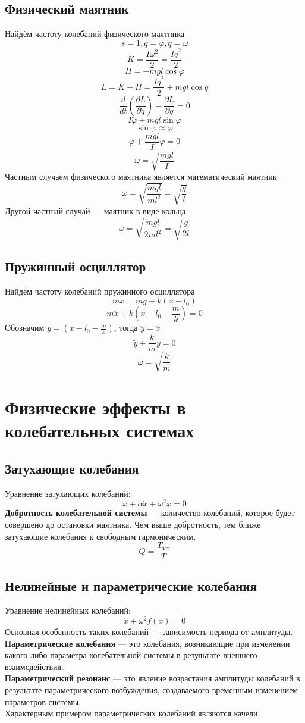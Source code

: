 \documentclass[fleqn,a4paper,12pt,titlepage,finall]{article}
\begin{document}
\subsection{Физический маятник}
Найдём частоту колебаний физического маятника
\[s = 1, q = \varphi, \dot{q} = \omega\]
\[K = \frac{I\omega^2}{2} = \frac{I\dot{q}^2}{2}\]
\[\Pi = -mgl\cos\varphi\]
\[L = K-\Pi = \frac{I\dot{q}^2}{2} + mgl\cos{q}\]
\[\frac{d}{dt}\left(\frac{\partial L}{\partial \dot{q}}\right) - \frac{\partial
L}{\partial q} = 0\]
\[I\ddot{\varphi} + mgl\sin\varphi\]
\[\sin\varphi \approx \varphi\]
\[\ddot{\varphi} + \frac{mgl}{I}\varphi = 0\]
\[\boxed{\omega = \sqrt{\frac{mgl}{I}}}\]
Частным случаем физического маятника является математический маятник
\[\omega = \sqrt{\frac{mgl}{ml^2}} = \sqrt{\frac{g}{l}}\]
Другой частный случай --- маятник в виде кольца
\[\omega = \sqrt{\frac{mgl}{2ml^2}} = \sqrt{\frac{g}{2l}}\]
\subsection{Пружинный осциллятор}
Найдём частоту колебаний пружинного осциллятора
\[m\ddot{x} = mg - k(x-l_0)\]
\[m\ddot{x} + k\left(x-l_0-\frac{m}{k}\right) = 0\]
Обозначим $y = \left(x-l_0-\frac{m}{k}\right)$, тогда $\ddot{y} = \ddot{x}$
\[\ddot{y} + \frac{k}{m}y = 0\]
\[\boxed{\omega = \sqrt{\frac{k}{m}}}\]

\section{Физические эффекты в колебательных системах}
\subsection{Затухающие колебания}
Уравнение затухающих колебаний:
\[\ddot{x} + \alpha\dot{x} + \omega^2x = 0\]
{\bf Добротность колебательной системы} --- количество колебаний, которое будет
совершено до остановки маятника. Чем выше добротность, тем ближе затухающие
колебания к свободным гармоническим.
\[Q=\frac{T_{\text{зат}}}{T}\]
\subsection{Нелинейные и параметрические колебания}
Уравнение нелинейных колебаний:
\[\ddot{x} + \omega^2f(x) = 0\]
Основная особенность таких колебаний --- зависимость периода от амплитуды. \\
{\bf Параметрические колебания} --- это колебания, возникающие при изменении
какого-либо параметра колебательной системы в результате внешнего
взаимодействия. \\
{\bf Параметрический резонанс} --- это явление возрастания амплитуды колебаний в
результате параметрического возбуждения, создаваемого временным изменением
параметров системы. \\
Характерным примером параметрических колебаний являются качели.
\end{document}
